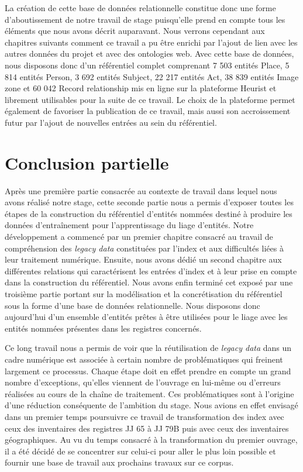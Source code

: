 \documentclass[a4paper,12pt,twoside]{book}
\begin{document}
	La création de cette base de données relationnelle constitue donc une forme d'aboutissement de notre travail de stage puisqu'elle prend en compte tous les éléments que nous avons décrit auparavant. Nous verrons cependant aux chapitres suivants comment ce travail a pu être enrichi par l'ajout de lien avec les autres données du projet et avec des ontologies web. Avec cette base de données, nous disposons donc d'un référentiel complet comprenant 7 503 entités Place, 5 814 entités Person, 3 692 entités Subject, 22 217 entités Act, 38 839 entités Image zone et 60 042 Record relationship mis en ligne sur la plateforme Heurist et librement utilisables pour la suite de ce travail. Le choix de la plateforme permet également de favoriser la publication de ce travail, mais aussi son accroissement futur par l'ajout de nouvelles entrées au sein du référentiel.
	
	\chapter*{Conclusion partielle}
	
	Après une première partie consacrée au contexte de travail dans lequel nous avons réalisé notre stage, cette seconde partie nous a permis d'exposer toutes les étapes de la construction du référentiel d'entités nommées destiné à produire les données d'entraînement pour l'apprentissage du liage d'entités. Notre développement a commencé par un premier chapitre consacré au travail de compréhension des \textit{legacy data} constituées par l'index et aux difficultés liées à leur traitement numérique. Ensuite, nous avons dédié un second chapitre aux différentes relations qui caractérisent les entrées d'index et à leur prise en compte dans la construction du référentiel. Nous avons enfin terminé cet exposé par une troisième partie portant sur la modélisation et la concrétisation du référentiel sous la forme d'une base de données relationnelle. Nous disposons donc aujourd'hui d'un ensemble d'entités prêtes à être utilisées pour le liage avec les entités nommées présentes dans les registres concernés.
	
	Ce long travail nous a permis de voir que la réutilisation de \textit{legacy data} dans un cadre numérique est associée à certain nombre de problématiques qui freinent largement ce processus. Chaque étape doit en effet prendre en compte un grand nombre d'exceptions, qu'elles viennent de l'ouvrage en lui-même ou d'erreurs réalisées au cours de la chaîne de traitement. Ces problématiques sont à l'origine d'une réduction conséquente de l'ambition du stage. Nous avions en effet envisagé dans un premier temps poursuivre ce travail de transformation des index avec ceux des inventaires des registres JJ 65 à JJ 79B puis avec ceux des inventaires géographiques. Au vu du temps consacré à la transformation du premier ouvrage, il a été décidé de se concentrer sur celui-ci pour aller le plus loin possible et fournir une base de travail aux prochains travaux sur ce corpus.
	
\end{document}

